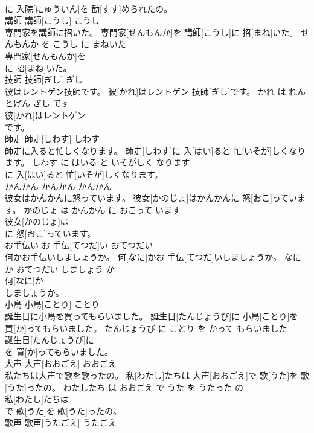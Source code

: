 \documentclass[8pt]{extreport}
\begin{document}
\begin{CJK}{UTF8}{min}
\\	に 入院[にゅういん]を 勧[すす]められたの。			
\\	講師	講師[こうし]	こうし	
\\	専門家を講師に招いた。	専門家[せんもんか]を 講師[こうし]に 招[まね]いた。	せんもんか を こうし に まねいた	
\\	専門家[せんもんか]を
\\	に 招[まね]いた。			
\\	技師	技師[ぎし]	ぎし	
\\	彼はレントゲン技師です。	彼[かれ]はレントゲン 技師[ぎし]です。	かれ は れんとげん ぎし です	
\\	彼[かれ]はレントゲン
\\	です。			
\\	師走	師走[しわす]	しわす	
\\	師走に入ると忙しくなります。	師走[しわす]に 入[はい]ると 忙[いそが]しくなります。	しわす に はいる と いそがしく なります	
\\	に 入[はい]ると 忙[いそが]しくなります。			
\\	かんかん	かんかん	かんかん	
\\	彼女はかんかんに怒っています。	彼女[かのじょ]はかんかんに 怒[おこ]っています。	かのじょ は かんかん に おこって います	
\\	彼女[かのじょ]は
\\	に 怒[おこ]っています。			
\\	お手伝い	お 手伝[てつだ]い	おてつだい	
\\	何かお手伝いしましょうか。	何[なに]かお 手伝[てつだ]いしましょうか。	なに か おてつだい しましょう か	
\\	何[なに]か
\\	しましょうか。			
\\	小鳥	小鳥[ことり]	ことり	
\\	誕生日に小鳥を買ってもらいました。	誕生日[たんじょうび]に 小鳥[ことり]を 買[か]ってもらいました。	たんじょうび に ことり を かって もらいました	
\\	誕生日[たんじょうび]に
\\	を 買[か]ってもらいました。			
\\	大声	大声[おおごえ]	おおごえ	
\\	私たちは大声で歌を歌ったの。	私[わたし]たちは 大声[おおごえ]で 歌[うた]を 歌[うた]ったの。	わたしたち は おおごえ で うた を うたった の	
\\	私[わたし]たちは
\\	で 歌[うた]を 歌[うた]ったの。			
\\	歌声	歌声[うたごえ]	うたごえ	

\end{CJK}
\end{document}
